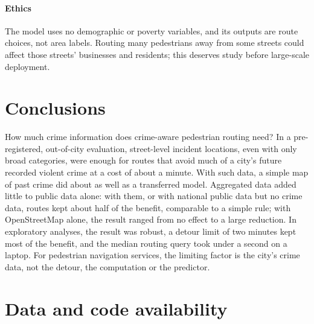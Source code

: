 \documentclass[preprint,12pt,authoryear]{elsarticle}
\begin{document}
\paragraph{Ethics} The model uses no demographic or poverty variables, and its outputs are route choices, not area labels. Routing many pedestrians away from some streets could affect those streets' businesses and residents; this deserves study before large-scale deployment.

\section{Conclusions}
How much crime information does crime-aware pedestrian routing need? In a pre-registered, out-of-city evaluation, street-level incident locations, even with only broad categories, were enough for routes that avoid much of a city's future recorded violent crime at a cost of about a minute. With such data, a simple map of past crime did about as well as a transferred model. Aggregated data added little to public data alone: with them, or with national public data but no crime data, routes kept about half of the benefit, comparable to a simple rule; with OpenStreetMap alone, the result ranged from no effect to a large reduction. In exploratory analyses, the result was robust, a detour limit of two minutes kept most of the benefit, and the median routing query took under a second on a laptop. For pedestrian navigation services, the limiting factor is the city's crime data, not the detour, the computation or the predictor.

\FloatBarrier
\section*{Data and code availability}
\end{document}
